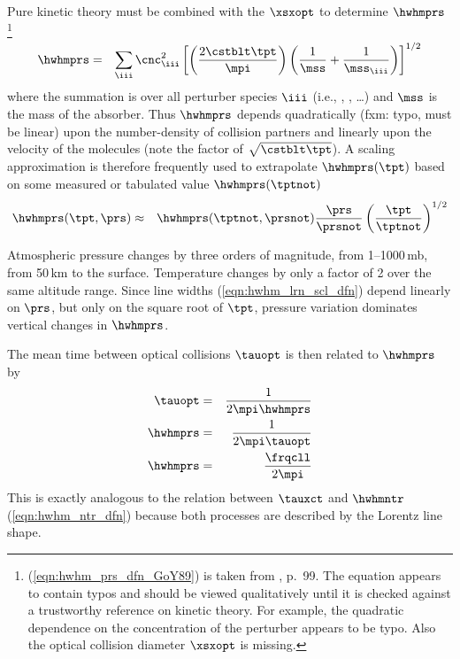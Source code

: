 \documentclass[12pt]{article}
\begin{document}
Pure kinetic theory must be combined with the  $\xsxopt$ to determine $\hwhmprs$%
\footnote{(\ref{eqn:hwhm_prs_dfn_GoY89}) is taken from \cite{GoY89}, p.~99.
The equation appears to contain typos and should be viewed
qualitatively until it is checked against a trustworthy reference on
kinetic theory. 
For example, the quadratic dependence on the concentration of
the perturber appears to be typo.
Also the optical collision diameter $\xsxopt$ is missing.}
\begin{eqnarray}
\hwhmprs & = & \sum_{\iii} \cnc_{\iii}^{2} 
\left[ \left( \frac{2 \cstblt \tpt}{\mpi} \right)
\left( \frac{1}{\mss} + \frac{1}{\mss_{\iii}}\right) \right]^{1/2}
\label{eqn:hwhm_prs_dfn_GoY89}
\end{eqnarray}
where the summation is over all perturber species $\iii$ (i.e., \Od,
\Nd, \ldots) and $\mss$ is the mass of the absorber.
Thus $\hwhmprs$ depends quadratically (fxm: typo, must be linear) upon
the number-density of collision partners and linearly upon the
velocity of the molecules (note the factor of $\sqrt{\cstblt \tpt}$). 
A scaling approximation is therefore frequently used to extrapolate
$\hwhmprs(\tpt)$ based on some measured or tabulated value
$\hwhmprs(\tptnot)$ 
\begin{eqnarray}
\hwhmprs(\tpt,\prs) & \approx & \hwhmprs(\tptnot,\prsnot) 
\frac{\prs}{\prsnot} \left( \frac{\tpt}{\tptnot} \right)^{1/2}
\label{eqn:hwhm_lrn_scl_dfn}
\end{eqnarray}

Atmospheric pressure changes by three orders of magnitude, from
1--1000\,mb, from 50\,km to the surface.
Temperature changes by only a factor of 2 over the same altitude
range. 
Since line widths (\ref{eqn:hwhm_lrn_scl_dfn}) depend linearly on
$\prs$, but only on the square root of $\tpt$, pressure variation
dominates vertical changes in $\hwhmprs$.

The mean time between optical collisions $\tauopt$ is then related to  
$\hwhmprs$ by
\begin{eqnarray}
\tauopt & = & \frac{1}{2 \mpi \hwhmprs} \nonumber \\
\hwhmprs & = & \frac{1}{2 \mpi \tauopt} \nonumber \\
\hwhmprs & = & \frac{\frqcll}{2 \mpi}
\label{eqn:tau_opt_dfn}
\end{eqnarray}
This is exactly analogous to the relation between $\tauxct$ and
$\hwhmntr$ (\ref{eqn:hwhm_ntr_dfn}) because both processes are
described by the Lorentz line shape.
\end{document}
